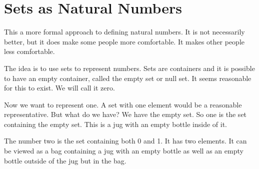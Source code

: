 \chapter{Sets as Natural Numbers}

This a more formal approach to defining natural numbers. It is not necessarily better, but it does make some people more comfortable. It makes other people less comfortable. 

The idea is to use sets to represent numbers. Sets are containers and it is possible to have an empty container, called the empty set or null set. It seems reasonable for this to exist. We will call it zero. 

Now we want to represent one. A set with one element would be a reasonable representative. But what do we have? We have the empty set. So one is the set containing the empty set. This is a jug with an empty bottle inside of it. 

The number two is the set containing both 0 and 1. It has two elements. It can be viewed as a bag containing a jug with an empty bottle as well as an empty bottle outside of the jug but in the bag. 

